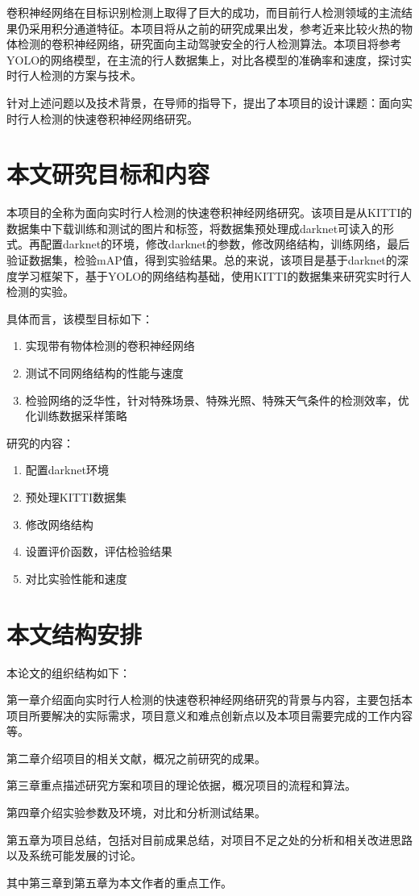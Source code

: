 {	卷积神经网络在目标识别检测上取得了巨大的成功，而目前行人检测领域的主流结果仍采用积分通道特征。本项目将从之前的研究成果出发，参考近来比较火热的物体检测的卷积神经网络，研究面向主动驾驶安全的行人检测算法。本项目将参考YOLO的网络模型，在主流的行人数据集上，对比各模型的准确率和速度，探讨实时行人检测的方案与技术。

	针对上述问题以及技术背景，在导师的指导下，提出了本项目的设计课题：面向实时行人检测的快速卷积神经网络研究。
}

\section{本文研究目标和内容}{
	本项目的全称为面向实时行人检测的快速卷积神经网络研究。该项目是从KITTI的数据集中下载训练和测试的图片和标签，将数据集预处理成darknet可读入的形式。再配置darknet的环境，修改darknet的参数，修改网络结构，训练网络，最后验证数据集，检验mAP值，得到实验结果。总的来说，该项目是基于darknet的深度学习框架下，基于YOLO的网络结构基础，使用KITTI的数据集来研究实时行人检测的实验。

	具体而言，该模型目标如下：
	\begin{enumerate}
	\item 实现带有物体检测的卷积神经网络
	\item 测试不同网络结构的性能与速度
	\item 检验网络的泛华性，针对特殊场景、特殊光照、特殊天气条件的检测效率，优化训练数据采样策略
	\end{enumerate}

	研究的内容：
	\begin{enumerate}
	\item 配置darknet环境
	\item 预处理KITTI数据集
	\item 修改网络结构
	\item 设置评价函数，评估检验结果
	\item 对比实验性能和速度
	\end{enumerate}
}

\section{本文结构安排}{
	本论文的组织结构如下：

	第一章介绍面向实时行人检测的快速卷积神经网络研究的背景与内容，主要包括本项目所要解决的实际需求，项目意义和难点创新点以及本项目需要完成的工作内容等。

	第二章介绍项目的相关文献，概况之前研究的成果。

	第三章重点描述研究方案和项目的理论依据，概况项目的流程和算法。

	第四章介绍实验参数及环境，对比和分析测试结果。

	第五章为项目总结，包括对目前成果总结，对项目不足之处的分析和相关改进思路以及系统可能发展的讨论。

	其中第三章到第五章为本文作者的重点工作。
}

